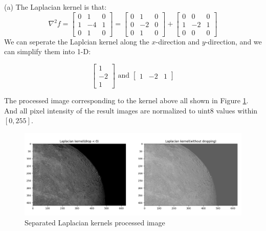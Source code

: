 \problem{}
(a) The Laplacian kernel is that:
$$
\nabla^2 f = \begin{bmatrix}
    0 & 1 & 0 \\
    1 & -4 & 1 \\
    0 & 1 & 0
\end{bmatrix}
=
\begin{bmatrix}
    0 & 1 & 0 \\
    0 & -2 & 0 \\
    0 & 1 & 0
\end{bmatrix}
+
\begin{bmatrix}
    0 & 0 & 0 \\
    1 & -2 & 1 \\
    0 & 0 & 0
\end{bmatrix}
$$
We can seperate the Laplcian kernel along the $x$-direction and $y$-direction, and we can simplify them into 1-D:

$$\begin{bmatrix}1\\-2\\1\end{bmatrix} \text{\ \ and \ \ } \begin{bmatrix}1 & -2 & 1\end{bmatrix}$$

The processed image corresponding to the kernel above all shown in Figure \ref{fig:p2a}.\\
And all pixel intensity of the result images are normalized to uint8 values within $[0,255]$.\\

\begin{figure}[htbp]
    \centering
	\includegraphics[width=1\textwidth]{../images/p2/p2.png}
    \caption{Separated Laplacian kernels processed image}
\label{fig:p2a}
\end{figure}



